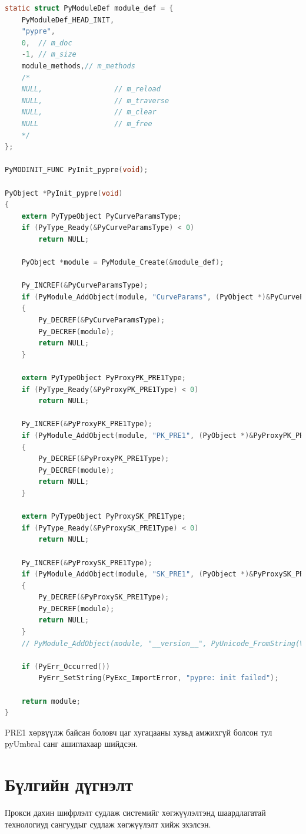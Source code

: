 \begin{lstlisting}[language=C, caption={setup.py}]
static struct PyModuleDef module_def = {
    PyModuleDef_HEAD_INIT,
    "pypre",
    0,  // m_doc
    -1, // m_size
    module_methods,// m_methods
    /*
    NULL,                 // m_reload
    NULL,                 // m_traverse
    NULL,                 // m_clear
    NULL                  // m_free
    */
};

PyMODINIT_FUNC PyInit_pypre(void);

PyObject *PyInit_pypre(void)
{
    extern PyTypeObject PyCurveParamsType;
    if (PyType_Ready(&PyCurveParamsType) < 0)
        return NULL;

    PyObject *module = PyModule_Create(&module_def);

    Py_INCREF(&PyCurveParamsType);
    if (PyModule_AddObject(module, "CurveParams", (PyObject *)&PyCurveParamsType) < 0)
    {
        Py_DECREF(&PyCurveParamsType);
        Py_DECREF(module);
        return NULL;
    }

    extern PyTypeObject PyProxyPK_PRE1Type;
    if (PyType_Ready(&PyProxyPK_PRE1Type) < 0)
        return NULL;

    Py_INCREF(&PyProxyPK_PRE1Type);
    if (PyModule_AddObject(module, "PK_PRE1", (PyObject *)&PyProxyPK_PRE1Type) < 0)
    {
        Py_DECREF(&PyProxyPK_PRE1Type);
        Py_DECREF(module);
        return NULL;
    }

    extern PyTypeObject PyProxySK_PRE1Type;
    if (PyType_Ready(&PyProxySK_PRE1Type) < 0)
        return NULL;

    Py_INCREF(&PyProxySK_PRE1Type);
    if (PyModule_AddObject(module, "SK_PRE1", (PyObject *)&PyProxySK_PRE1Type) < 0)
    {
        Py_DECREF(&PyProxySK_PRE1Type);
        Py_DECREF(module);
        return NULL;
    }
    // PyModule_AddObject(module, "__version__", PyUnicode_FromString(VERSION));

    if (PyErr_Occurred())
        PyErr_SetString(PyExc_ImportError, "pypre: init failed");

    return module;
}
\end{lstlisting}

\noindent PRE1 хөрвүүлж байсан боловч цаг хугацааны хувьд амжихгүй болсон тул pyUmbral санг ашиглахаар шийдсэн.

\section{Бүлгийн дүгнэлт}
Прокси дахин шифрлэлт судлаж системийг хөгжүүлэлтэнд шаардлагатай технологиуд сангуудыг судлаж хөгжүүлэлт хийж эхэлсэн.